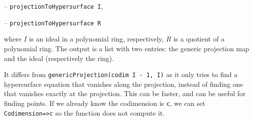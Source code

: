 \documentclass[11pt]{amsart}
\theoremstyle{definition}
\begin{document}
\vspace{0.5em}
-- {\tt projectionToHypersurface I},

-- {\tt projectionToHypersurface R} 
\vspace{0.5em}

\noindent where $I$ is an ideal in a polynomial ring, respectively, $R$ is a quotient of a polynomial ring. The output is
a list with two entries: the generic projection map and the ideal (respectively the ring).

It differs from {\tt genericProjection(codim I - 1, I)} as it only tries to find a hypersurface equation that vanishes along the projection, instead of finding one that vanishes exactly at the projection.  This can be faster, and can be useful for finding points.   If we already know the codimension is {\tt c}, we can set {\tt Codimension=>c} so the function does not compute it. 

\begin{comment}~~

  ~~
  
  {{\small\color{blue}
\begin{verbatim}
	i2 : R = ZZ/5[x, y, z];
	
	i3 : I = ideal(random(3, R) - 2, random(2, R));
	
	o3 : Ideal of R
	
	i4 : projectionToHypersurface(I)
	
	            ZZ                             4    3      2 2     4
	o4 = (map(R,--[y, z],{x + 2y, 2y}), ideal(y  + y z - 2y z  - 2z  - y - z))
	            5
	
    o4 : Sequence

	i5 : projectionToHypersurface(R/I)
	
	
	
                           	                    R                    
	o5 = (map(--------------------------------------------------------------
	    3       2     3            2        2       2       2     
	(- x  - 2x*y  - 2y  - x*y*z + y z - 2x*z  + 2y*z  - 2, x  - 2x
	-------------------------------------------------------------------
                                    ZZ                       
	                                    --[y, z]                 
	                                    5                       
	--------------------,----------------------------------------------
	      2               4 2    3 3       5     6     3       2     3 
	*y - y  + x*z - y*z) y z  + y z  - 2y*z  + 2z  + 2y  + 2y*z  + 2z  
	-------------------------------------------------------------------
                    	       ZZ
                	           --[y, z]
	                            5
	---,{x - z, y}), -------------------------------------------------)
	                  4 2    3 3       5     6     3       2     3
	- 1              y z  + y z  - 2y*z  + 2z  + 2y  + 2y*z  + 2z  - 1
	
	o5 : Sequence
	\end{verbatim}
    }}
\end{comment}
\end{document}
